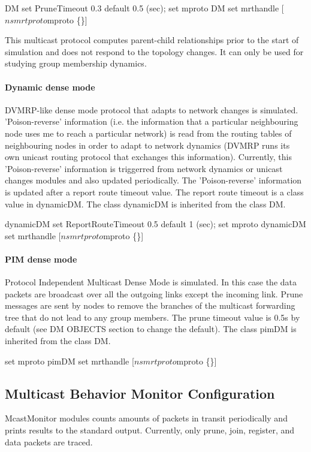 \begin{program}
	DM set PruneTimeout 0.3           \; default 0.5 (sec);
	set mproto DM
	set mrthandle [$ns mrtproto $mproto \{\}]
\end{program}

This multicast protocol computes parent-child relationships prior to
the start of simulation and does not respond to the topology
changes. It can only be used for studying group membership dynamics.

\paragraph{Dynamic dense mode}
DVMRP-like dense mode protocol that adapts to network changes is
simulated.  'Poison-reverse' information (i.e. the information that a
particular neighbouring node uses me to reach a particular network) is
read from the routing tables of neighbouring nodes in order to adapt
to network dynamics (DVMRP runs its own unicast routing protocol that
exchanges this information).  Currently, this 'Poison-reverse'
information is triggerred from network dynamics or unicast changes
modules and also updated periodically.  The 'Poison-reverse'
information is updated after a report route timeout value. The report
route timeout is a class value in dynamicDM.  The class dynamicDM is
inherited from the class DM.

\begin{program}
	dynamicDM set ReportRouteTimeout 0.5  \; default 1 (sec);
	set mproto dynamicDM
	set mrthandle [$ns mrtproto $mproto \{\}]
\end{program}

\paragraph{PIM dense mode}
Protocol Independent Multicast Dense Mode is simulated.  In this case
the data packets are broadcast over all the outgoing links except the
incoming link. Prune messages are sent by nodes to remove the branches
of the multicast forwarding tree that do not lead to any group
members. The prune timeout value is 0.5s by default (see DM OBJECTS
section to change the default). The class pimDM is inherited from the
class DM.

\begin{program}
	set mproto pimDM
	set mrthandle [$ns mrtproto $mproto \{\}]
\end{program}

\subsection{Multicast Behavior Monitor Configuration}
McastMonitor modules counts amounts of packets in transit periodically
and prints results to the standard output.  Currently, only prune,
join, register, and data packets are traced.

